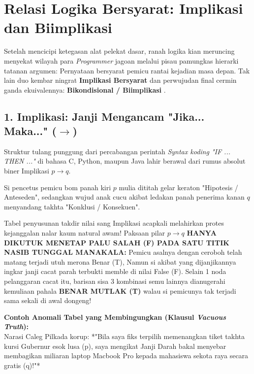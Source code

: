 \section{Relasi Logika Bersyarat: Implikasi dan Biimplikasi}

Setelah mencicipi ketegasan alat pelekat dasar, ranah logika kian meruncing menyekat wilayah para \textit{Programmer} jagoan melalui pisau pamungkas hierarki tatanan argumen: Pernyataan bersyarat pemicu rantai kejadian masa depan. Tak lain duo kembar ningrat \textbf{Implikasi Bersyarat} dan perwujudan final cermin ganda ekuivalennya: \textbf{Bikondisional / Biimplikasi} \cite{rosen2019}.

\subsection{1. Implikasi: Janji Mengancam "Jika... Maka..." ($\rightarrow$)}

Struktur tulang punggung dari percabangan perintah \textit{Syntax koding "IF ... THEN ..."} di bahasa C, Python, maupun Java lahir berawal dari rumus absolut biner Implikasi $p \rightarrow q$.

Si pencetus pemicu bom panah kiri $p$ mulia dititah gelar keraton "Hipotesis / Anteseden", sedangkan wujud anak cucu akibat ledakan panah penerima kanan $q$ menyandang takhta "Konklusi / Konsekuen".

\begin{definisi}
Tabel penyusunan takdir nilai sang Implikasi acapkali melahirkan protes kejanggalan nalar kaum natural awam! Paksaan pilar $p \rightarrow q$ \textbf{HANYA DIKUTUK MENETAP PALU SALAH (F) PADA SATU TITIK NASIB TUNGGAL MANAKALA:} Pemicu asalnya dengan ceroboh telah matang terjadi utuh merona Benar (T), Namun si akibat yang dijanjikannya ingkar janji cacat parah terbukti memble di nilai False (F). Selain 1 noda pelanggaran cacat itu, barisan sisa 3 kombinasi semu lainnya dianugerahi kemuliaan pahala \textbf{BENAR MUTLAK (T)} walau si pemicunya tak terjadi sama sekali di awal dongeng!
\end{definisi}

\textbf{Contoh Anomali Tabel yang Membingungkan (Klausul \textit{Vacuous Truth}):} \cite{rosen2019,forallx} \\
Narasi Caleg Pilkada korup: *"Bila saya fiks terpilih memenangkan tiket takhta kursi Gubernur esok lusa (p), saya mengikat Janji Darah bakal menyebar membagikan miliaran laptop Macbook Pro kepada mahasiswa sekota raya secara gratis (q)!"*

